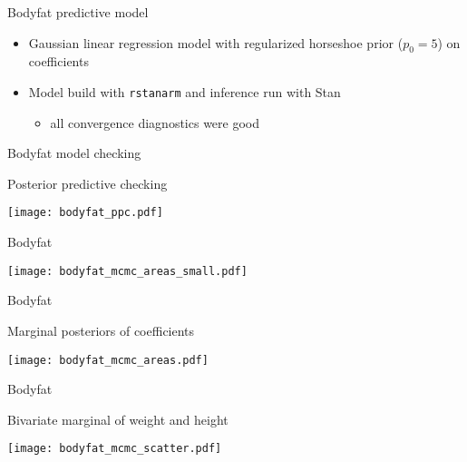 \documentclass[english,t]{beamer}
\begin{document}
\begin{frame}
  
  {\Large\color{navyblue} Bodyfat predictive model}

  \begin{itemize}
  \item<1-> Gaussian linear regression model with regularized horseshoe
    prior ($p_0=5$) on coefficients
  \item<2-> Model build with {\tt rstanarm} and inference run with
    Stan
    \begin{itemize}
    \item all convergence diagnostics were good
    \end{itemize}
\end{itemize}
\end{frame}

\begin{frame}
  
  {\Large\color{navyblue} Bodyfat model checking}

  Posterior predictive checking
  
  \texttt{[image: bodyfat\_ppc.pdf]}

\end{frame}

\begin{frame}
  
  {\Large\color{navyblue} Bodyfat}

  
  \texttt{[image: bodyfat\_mcmc\_areas\_small.pdf]}

\end{frame}

\begin{frame}
  
  {\Large\color{navyblue} Bodyfat}

  Marginal posteriors of coefficients
  
  \texttt{[image: bodyfat\_mcmc\_areas.pdf]}

\end{frame}

\begin{frame}
  
  {\Large\color{navyblue} Bodyfat}

  Bivariate marginal of weight and height
  
  \texttt{[image: bodyfat\_mcmc\_scatter.pdf]}

\end{frame}
\end{document}

